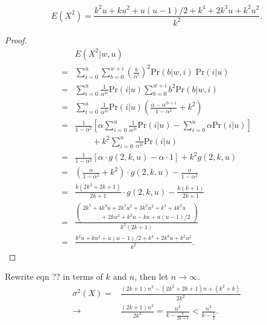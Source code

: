 \documentclass{sig-alternate}
\begin{document}

\begin{equation}
E(X^2) = \frac{k^2u + ku^2 + u(u\!-\!1)/2 + k^4 + 2k^3u + k^2u^2}{k^2}.
\end{equation}
\begin{proof}
\begin{align}
 & E(X^2 | w, u) \\
= & \sum_{i=0}^u \sum_{b=0}^{w+i} \left( \frac{b}{\alpha^i} \right)^2 \mathrm{Pr}(b|w,i) \; \mathrm{Pr}(i|u) \\
= & \sum_{i=0}^u \frac{1}{\alpha^{2i}} 
\mathrm{Pr}(i|u)
\sum_{b=0}^{w+i} b^2 
\mathrm{Pr}(b|w,i) \\
= & \sum_{i=0}^u \frac{1}{\alpha^{2i}} 
\mathrm{Pr}(i|u)
\left(  \frac{\alpha-\alpha^{2i+1}}{1-\alpha^2} + k^2  \right) \\
= & \frac{1}{1-\alpha^2} 
\left[
\alpha \sum_{i=0}^u \frac{1}{\alpha^{2i}} \mathrm{Pr}(i|u) -
\sum_{i=0}^u \alpha \mathrm{Pr}(i|u)
\right] \\
 & \quad \quad + k^2 \sum_{i=0}^u \frac{1}{\alpha^{2i}} \mathrm{Pr}(i|u) \\
= & \frac{1}{1-\alpha^2} 
\left[ \alpha \cdot g(2,k,u) - \alpha \cdot 1 \right] + k^2 g(2,k,u) \\
= & (\frac{\alpha}{1-\alpha^2} + k^2) \cdot g(2,k,u) - \frac{\alpha}{1-\alpha^2} \\
= & \frac{k(2k^2+2k+1)}{2k+1}
\cdot g(2,k,u) - 
\frac{k(k+1)}{2k+1} \\
= & \frac{
\left(\begin{array}{c}
2k^5 + 4k^4u + 2k^3u^2 + 3k^2u^2 + k^4 + 4k^3u \\
\quad \quad \quad + 2ku^2 + k^2u - ku + u(u-1)/2
\end{array}\right)
}{k^2 (2k+1)} \\
= & \frac{k^2u + ku^2 + u(u\!-\!1)/2 + k^4 + 2k^3u + k^2u^2}{k^2}.
\end{align}
\end{proof}

 Rewrite eqn ?? in terms of $k$ and $n$, then let $n \rightarrow \infty$.
\begin{align}
 \sigma^2 (X) = & \frac{(2k+1)n^2 - (2k^2+2k+1)n + (k^2+k)}{2k^2} \\
       \rightarrow & \frac{(2k+1)n^2}{2k^2} = \frac{n^2}{k-\frac{k}{2k+1}} < \frac{n^2}{k-\frac{1}{2}}.
\end{align}
\end{document}
